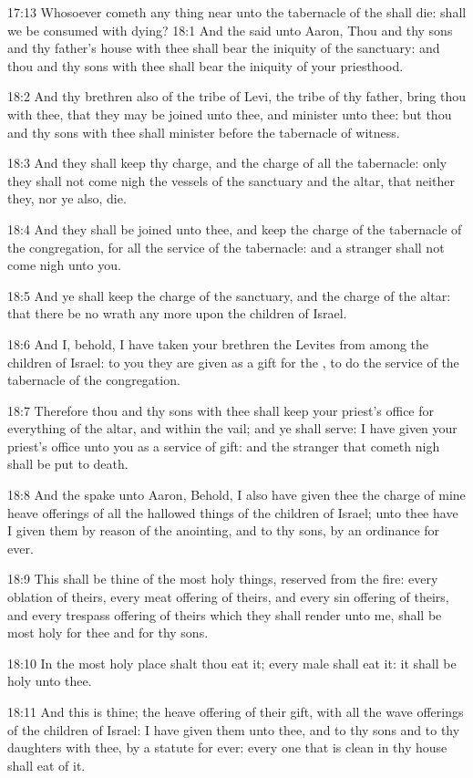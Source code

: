 17:13 Whosoever cometh any thing near unto the tabernacle of the \LORD shall die: shall we be consumed with dying?  18:1 And the \LORD said unto Aaron, Thou and thy sons and thy father's house with thee shall bear the iniquity of the sanctuary: and thou and thy sons with thee shall bear the iniquity of your priesthood.

18:2 And thy brethren also of the tribe of Levi, the tribe of thy father, bring thou with thee, that they may be joined unto thee, and minister unto thee: but thou and thy sons with thee shall minister before the tabernacle of witness.

18:3 And they shall keep thy charge, and the charge of all the tabernacle: only they shall not come nigh the vessels of the sanctuary and the altar, that neither they, nor ye also, die.

18:4 And they shall be joined unto thee, and keep the charge of the tabernacle of the congregation, for all the service of the tabernacle: and a stranger shall not come nigh unto you.

18:5 And ye shall keep the charge of the sanctuary, and the charge of the altar: that there be no wrath any more upon the children of Israel.

18:6 And I, behold, I have taken your brethren the Levites from among the children of Israel: to you they are given as a gift for the \LORD, to do the service of the tabernacle of the congregation.

18:7 Therefore thou and thy sons with thee shall keep your priest's office for everything of the altar, and within the vail; and ye shall serve: I have given your priest's office unto you as a service of gift: and the stranger that cometh nigh shall be put to death.

18:8 And the \LORD spake unto Aaron, Behold, I also have given thee the charge of mine heave offerings of all the hallowed things of the children of Israel; unto thee have I given them by reason of the anointing, and to thy sons, by an ordinance for ever.

18:9 This shall be thine of the most holy things, reserved from the fire: every oblation of theirs, every meat offering of theirs, and every sin offering of theirs, and every trespass offering of theirs which they shall render unto me, shall be most holy for thee and for thy sons.

18:10 In the most holy place shalt thou eat it; every male shall eat it: it shall be holy unto thee.

18:11 And this is thine; the heave offering of their gift, with all the wave offerings of the children of Israel: I have given them unto thee, and to thy sons and to thy daughters with thee, by a statute for ever: every one that is clean in thy house shall eat of it.


